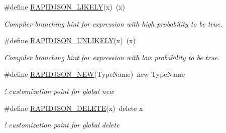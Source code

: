 \begin{DoxyCompactItemize}
$$\#define \hyperlink{a00636_ga5dc14176a9e71ace282404b0bcda57a1}{R\+A\+P\+I\+D\+J\+S\+O\+N\+\_\+\+L\+I\+K\+E\+LY}(x)~(x)
\begin{DoxyCompactList}\small\item\em Compiler branching hint for expression with high probability to be true. \end{DoxyCompactList}\item 
\#define \hyperlink{a00636_ga6a2b1695c13e77ae425e3cbac980ccb5}{R\+A\+P\+I\+D\+J\+S\+O\+N\+\_\+\+U\+N\+L\+I\+K\+E\+LY}(x)~(x)
\begin{DoxyCompactList}\small\item\em Compiler branching hint for expression with low probability to be true. \end{DoxyCompactList}\item 
\mbox{\label{a00560_abdc7cd7902748ffe6626d71c59a73c3b}} 
\#define \hyperlink{a00560_abdc7cd7902748ffe6626d71c59a73c3b}{R\+A\+P\+I\+D\+J\+S\+O\+N\+\_\+\+N\+EW}(Type\+Name)~new Type\+Name
\begin{DoxyCompactList}\small\item\em ! customization point for global {\ttfamily new} \end{DoxyCompactList}\item 
\mbox{\label{a00560_a52c941c3fdd646527cdcd42aa846a28a}} 
\#define \hyperlink{a00560_a52c941c3fdd646527cdcd42aa846a28a}{R\+A\+P\+I\+D\+J\+S\+O\+N\+\_\+\+D\+E\+L\+E\+TE}(x)~delete x
\begin{DoxyCompactList}\small\item\em ! customization point for global {\ttfamily delete} \end{DoxyCompactList}\end{DoxyCompactItemize}
